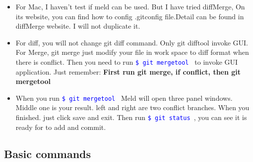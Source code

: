 \documentclass[a4paper,12pt,twoside]{book}
\newcommand{\linuxcommand}[1]{\texttt{\textcolor{blue}{\$ #1 \Pisymbol{psy}{191}}}}
\begin{document}
\begin{itemize}
\begin{enumerate}
\end{enumerate}

\begin{verbatim}       
[diff]
	tool = meld
[difftool]
	prompt = false
[difftool "meld"]
	cmd = \"C:/Program Files (x86)/Meld/Meld.exe\" $LOCAL $REMOTE


[merge]
tool = meld

[mergetool "meld"]
keepBackup = false
trustExitCode = false

[mergetool "meld"]
path = C:\\Program Files (x86)\\Meld\\Meld.exe
\end{verbatim}



      \item For Mac, I haven't test if meld can be used. But I have tried diffMerge, On its website, you can find how to config .gitconfig file.Detail can be found in diffMerge website. I will not duplicate it.

      \item For diff, you will not change git diff command. Only git difftool invoke GUI. For Merge, git merge just modify your file in work space to diff format when there is conflict. Then you need to run \linuxcommand{git mergetool} to invoke GUI application.  Just remember: \textbf{First run git merge, if conflict, then git mergetool}

\item When you run \linuxcommand{git mergetool} Meld will open three panel windows. Middle one is your result. left and right are two conflict branches.  When you finished. just click save and exit. Then run \linuxcommand{git status}, you can see it is ready for to add and commit. 
 
\end{itemize}

\subsection{Basic commands}
\end{document}
